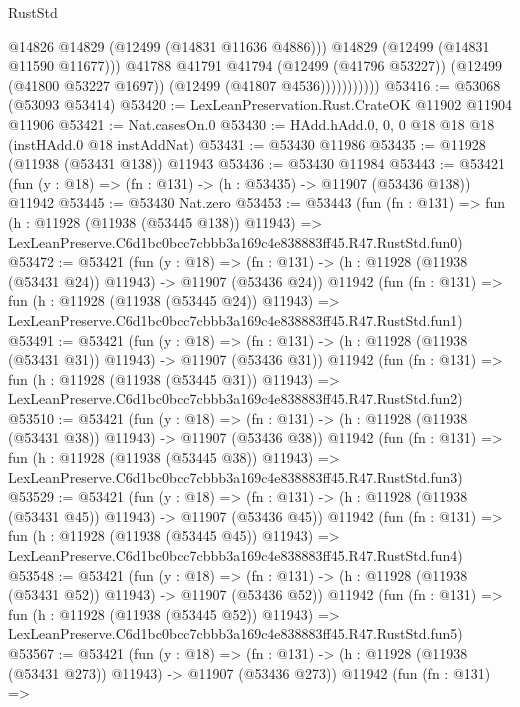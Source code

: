 \begin{lexlean}{RustStd}
\begin{coremodule}
                          @14826
                          @14829
                          (@12499 (@14831 @11636 @4886)))
                        @14829
                        (@12499 (@14831 @11590 @11677)))
                      @41788
                      @41791
                      @41794
                      (@12499 (@41796 @53227))
                      (@12499 (@41800 @53227 @1697))
                      (@12499 (@41807 @4536)))))))))))
@53416 := @53068 (@53093 @53414)
@53420 := LexLeanPreservation.Rust.CrateOK @11902 @11904 @11906
@53421 := Nat.casesOn.{0}
@53430 := HAdd.hAdd.{0, 0, 0} @18 @18 @18 (instHAdd.{0} @18 instAddNat)
@53431 := @53430 @11986
@53435 := @11928 (@11938 (@53431 @138)) @11943
@53436 := @53430 @11984
@53443 := @53421 (fun (y : @18) => (fn : @131) -> (h : @53435) -> @11907 (@53436 @138)) @11942
@53445 := @53430 Nat.zero
@53453 := @53443
    (fun (fn : @131) =>
    fun (h : @11928 (@11938 (@53445 @138)) @11943) =>
    LexLeanPreserve.C6d1bc0bcc7cbbb3a169c4e838883ff45.R47.RustStd.fun0)
@53472 := @53421
    (fun (y : @18) =>
    (fn : @131) -> (h : @11928 (@11938 (@53431 @24)) @11943) -> @11907 (@53436 @24))
    @11942
    (fun (fn : @131) =>
    fun (h : @11928 (@11938 (@53445 @24)) @11943) =>
    LexLeanPreserve.C6d1bc0bcc7cbbb3a169c4e838883ff45.R47.RustStd.fun1)
@53491 := @53421
    (fun (y : @18) =>
    (fn : @131) -> (h : @11928 (@11938 (@53431 @31)) @11943) -> @11907 (@53436 @31))
    @11942
    (fun (fn : @131) =>
    fun (h : @11928 (@11938 (@53445 @31)) @11943) =>
    LexLeanPreserve.C6d1bc0bcc7cbbb3a169c4e838883ff45.R47.RustStd.fun2)
@53510 := @53421
    (fun (y : @18) =>
    (fn : @131) -> (h : @11928 (@11938 (@53431 @38)) @11943) -> @11907 (@53436 @38))
    @11942
    (fun (fn : @131) =>
    fun (h : @11928 (@11938 (@53445 @38)) @11943) =>
    LexLeanPreserve.C6d1bc0bcc7cbbb3a169c4e838883ff45.R47.RustStd.fun3)
@53529 := @53421
    (fun (y : @18) =>
    (fn : @131) -> (h : @11928 (@11938 (@53431 @45)) @11943) -> @11907 (@53436 @45))
    @11942
    (fun (fn : @131) =>
    fun (h : @11928 (@11938 (@53445 @45)) @11943) =>
    LexLeanPreserve.C6d1bc0bcc7cbbb3a169c4e838883ff45.R47.RustStd.fun4)
@53548 := @53421
    (fun (y : @18) =>
    (fn : @131) -> (h : @11928 (@11938 (@53431 @52)) @11943) -> @11907 (@53436 @52))
    @11942
    (fun (fn : @131) =>
    fun (h : @11928 (@11938 (@53445 @52)) @11943) =>
    LexLeanPreserve.C6d1bc0bcc7cbbb3a169c4e838883ff45.R47.RustStd.fun5)
@53567 := @53421
    (fun (y : @18) =>
    (fn : @131) -> (h : @11928 (@11938 (@53431 @273)) @11943) -> @11907 (@53436 @273))
    @11942
    (fun (fn : @131) =>

\end{coremodule}
\end{lexlean}
